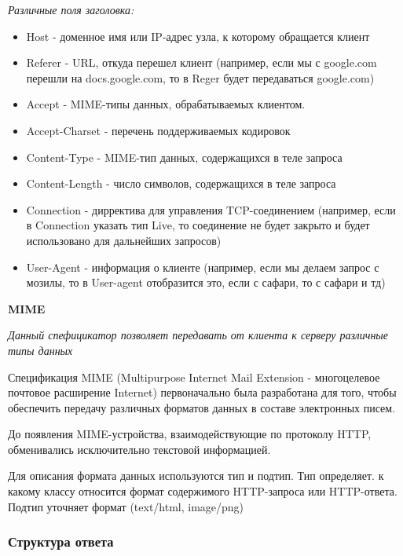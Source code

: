 \documentclass[a4paper,12pt]{article}
\begin{document}
	\textit{Различные поля заголовка:}
	\begin{itemize}
		\item Host - доменное имя или IP-адрес узла, к которому обращается клиент
		\item Referer - URL, откуда перешел клиент (например, если мы с google.com перешли на docs.google.com, то в Reger будет передаваться google.com)
		\item Accept - MIME-типы данных, обрабатываемых клиентом.
		\item Accept-Charset - перечень поддерживаемых кодировок
		\item Content-Type - MIME-тип данных, содержащихся в теле запроса
		\item Content-Length - число символов, содержащихся в теле запроса
		\item Connection - дирректива для управления TCP-соединением (например, если в Connection указать тип Live, то соединение не будет закрыто и будет использовано для дальнейших запросов)
		\item User-Agent - информация о клиенте (например, если мы делаем запрос с мозилы, то в User-agent отобразится это, если с сафари, то с сафари и тд)
	\end{itemize}

	{\bf MIME}
	
	\textit{Данный спефицикатор позволяет передавать от клиента к серверу различные типы данных}
	
	Спецификация MIME (Multipurpose Internet Mail Extension - многоцелевое почтовое расширение Internet) первоначально была разработана для того, чтобы обеспечить передачу различных форматов данных в составе электронных писем.
	
	До появления MIME-устройства, взаимодействующие по протоколу HTTP, обменивались исключительно текстовой информацией.
	
	Для описания формата данных используются тип и подтип. Тип определяет. к какому классу относится формат содержимого HTTP-запроса или HTTP-ответа. Подтип уточняет формат (text/html, image/png)
	
	\subsubsection{Структура ответа}
	
\end{document}
